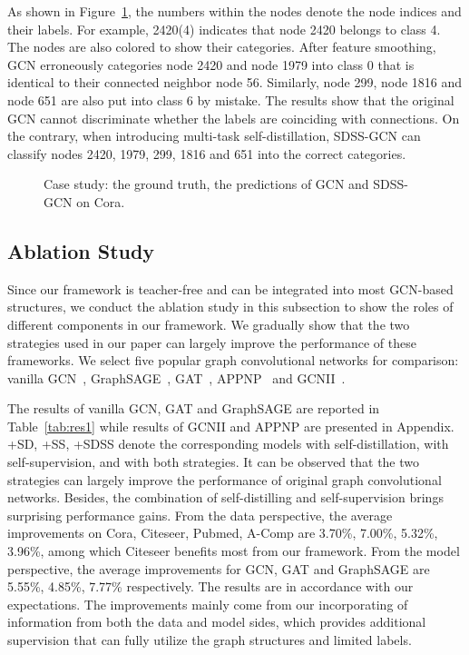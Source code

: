\documentclass[letterpaper]{article} \usepackage{aaai22} \usepackage{times} \usepackage{helvet} \usepackage{courier} \usepackage[hyphens]{url} \usepackage{graphicx} \urlstyle{rm} \def\UrlFont{\rm} \usepackage{subfigure}
\begin{document}
	As shown in Figure~\ref{fig:casestudy}, the numbers within the nodes denote the node indices and their labels. For example, 2420(4) indicates that node 2420 belongs to class 4. The nodes are also colored to show their categories. After feature smoothing, GCN erroneously categories node 2420 and node 1979 into class 0 that is identical to their connected neighbor node 56. Similarly, node 299, node 1816 and node 651 are also put into class 6 by mistake. The results show that the original GCN cannot discriminate whether the labels are coinciding with connections. On the contrary, when introducing multi-task self-distillation, SDSS-GCN can classify nodes 2420, 1979, 299, 1816 and 651 into the correct categories.
	
	\begin{figure}[htbp]
		\centering
		\label{mismatchGroudTruth}\hspace{0.04in}
		\label{mismatchGCN}\hspace{0.04in}
		\label{mismatchSDSS-GCN}
		\caption{Case study: the ground truth, the predictions of GCN and SDSS-GCN on Cora.}
		\label{fig:casestudy}
	\end{figure}
	
	\subsection{Ablation Study}
	
	Since our framework is teacher-free and can be integrated into most GCN-based structures, we conduct the ablation study in this subsection to show the roles of different components in our framework. We gradually show that the two strategies used in our paper can largely improve the performance of these frameworks. We select five popular graph convolutional networks for comparison: vanilla GCN~\cite{kipf2016semiGCN}, GraphSAGE~\cite{Hamilton2017GraphSAGE}, GAT~\cite{velivckovic2017GAT}, APPNP~\cite{Klicpera2019APPNP} and GCNII~\cite{chen2020GCNII}.
	
	The results of vanilla GCN, GAT and GraphSAGE are reported in Table~\ref{tab:res1} while results of GCNII and APPNP are presented in Appendix. +SD, +SS, +SDSS denote the corresponding models with self-distillation, with self-supervision, and with both strategies. It can be observed that the two strategies can largely improve the performance of original graph convolutional networks. Besides, the combination of self-distilling and self-supervision brings surprising performance gains. From the data perspective, the average improvements on Cora, Citeseer, Pubmed, A-Comp are 3.70\%, 7.00\%, 5.32\%, 3.96\%, among which Citeseer benefits most from our framework. From the model perspective, the average improvements for GCN, GAT and GraphSAGE are 5.55\%, 4.85\%, 7.77\% respectively. The results are in accordance with our expectations. The improvements mainly come from our incorporating of information from both the data and model sides, which provides additional supervision that can fully utilize the graph structures and limited labels.
	
\end{document}
